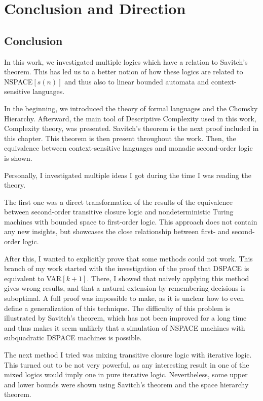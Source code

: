 \chapter{Conclusion and Direction}\label{ch:conclusion-and-direction}

\section{Conclusion}\label{sec:conclusion}
In this work, we investigated multiple logics which have a relation to Savitch's theorem.
This has led us to a better notion of how these logics are related to NSPACE$[s(n)]$ and thus also to linear bounded automata and context-sensitive languages.

In the beginning, we introduced the theory of formal languages and the Chomsky Hierarchy.
Afterward, the main tool of Descriptive Complexity used in this work, Complexity theory, was presented.
Savitch's theorem is the next proof included in this chapter.
This theorem is then present throughout the work.
Then, the equivalence between context-sensitive languages and monadic second-order logic is shown.

Personally, I investigated multiple ideas I got during the time I was reading the theory.

The first one was a direct transformation of the results of the equivalence between second-order transitive closure logic and nondeterministic Turing machines with bounded space to first-order logic.
This approach does not contain any new insights, but showcases the close relationship between first- and second-order logic.

After this, I wanted to explicitly prove that some methods could not work.
This branch of my work started with the investigation of the proof that DSPACE is equivalent to VAR$[k + 1]$.
There, I showed that naively applying this method gives wrong results, and that a natural extension by remembering decisions is suboptimal.
A full proof was impossible to make, as it is unclear how to even define a generalization of this technique.
The difficulty of this problem is illustrated by Savitch's theorem, which has not been improved for a long time and thus makes it seem unlikely that a simulation of NSPACE machines with subquadratic DSPACE machines is possible.

The next method I tried was mixing transitive closure logic with iterative logic.
This turned out to be not very powerful, as any interesting result in one of the mixed logics would imply one in pure iterative logic.
Nevertheless, some upper and lower bounds were shown using Savitch's theorem and the space hierarchy theorem.

